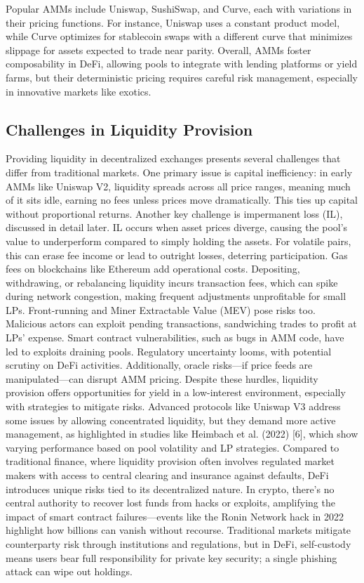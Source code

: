 \documentclass{article}
\begin{document}
Popular AMMs include Uniswap, SushiSwap, and Curve, each with variations in their pricing functions. For instance, Uniswap uses a constant product model, while Curve optimizes for stablecoin swaps with a different curve that minimizes slippage for assets expected to trade near parity. Overall, AMMs foster composability in DeFi, allowing pools to integrate with lending platforms or yield farms, but their deterministic pricing requires careful risk management, especially in innovative markets like exotics.
\subsection{Challenges in Liquidity Provision}
Providing liquidity in decentralized exchanges presents several challenges that differ from traditional markets. One primary issue is capital inefficiency: in early AMMs like Uniswap V2, liquidity spreads across all price ranges, meaning much of it sits idle, earning no fees unless prices move dramatically. This ties up capital without proportional returns. Another key challenge is impermanent loss (IL), discussed in detail later. IL occurs when asset prices diverge, causing the pool’s value to underperform compared to simply holding the assets. For volatile pairs, this can erase fee income or lead to outright losses, deterring participation.
Gas fees on blockchains like Ethereum add operational costs. Depositing, withdrawing, or rebalancing liquidity incurs transaction fees, which can spike during network congestion, making frequent adjustments unprofitable for small LPs. Front-running and Miner Extractable Value (MEV) pose risks too. Malicious actors can exploit pending transactions, sandwiching trades to profit at LPs’ expense. Smart contract vulnerabilities, such as bugs in AMM code, have led to exploits draining pools. Regulatory uncertainty looms, with potential scrutiny on DeFi activities. Additionally, oracle risks—if price feeds are manipulated—can disrupt AMM pricing. Despite these hurdles, liquidity provision offers opportunities for yield in a low-interest environment, especially with strategies to mitigate risks. Advanced protocols like Uniswap V3 address some issues by allowing concentrated liquidity, but they demand more active management, as highlighted in studies like Heimbach et al. (2022) [6], which show varying performance based on pool volatility and LP strategies.
Compared to traditional finance, where liquidity provision often involves regulated market makers with access to central clearing and insurance against defaults, DeFi introduces unique risks tied to its decentralized nature. In crypto, there's no central authority to recover lost funds from hacks or exploits, amplifying the impact of smart contract failures—events like the Ronin Network hack in 2022 highlight how billions can vanish without recourse. Traditional markets mitigate counterparty risk through institutions and regulations, but in DeFi, self-custody means users bear full responsibility for private key security; a single phishing attack can wipe out holdings.
\end{document}

